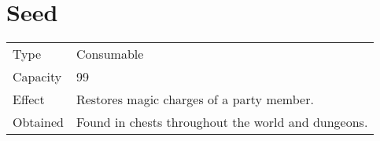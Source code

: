 \section{Seed}
\label{item:seed}


\noindent\begin{tabularx}{\textwidth}[l]{lX}
	Type
	& Consumable
\\ %
	Capacity
	& 99
\\ %
	Effect
	& Restores magic charges of a party member.
\\ %
	Obtained
	& Found in chests throughout the world and dungeons.
\end{tabularx}
